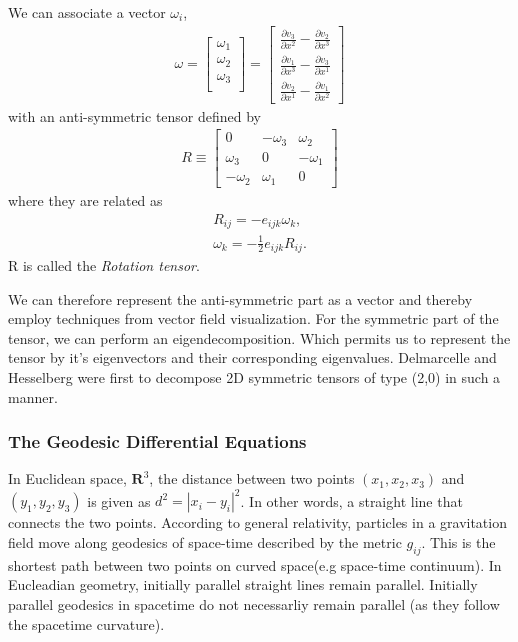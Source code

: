 \documentclass[main.tex]{subfiles}
\begin{document}
We can associate a vector $\omega_i$, 
\begin{align*}
\omega = 
\begin{bmatrix}
\omega_1\\
\omega_2\\
\omega_3\\
\end{bmatrix} =
\begin{bmatrix}
\frac{\partial v_3}{\partial x^2} - \frac{\partial v_2}{\partial x^3}\\
\frac{\partial v_1}{\partial x^3} - \frac{\partial v_3}{\partial x^1}\\
\frac{\partial v_2}{\partial x^1} - \frac{\partial v_1}{\partial x^2}
\end{bmatrix}
\end{align*}
with an anti-symmetric tensor defined by
\begin{align*}
R \equiv
\begin{bmatrix}
0  & -\omega_3 & \omega_2\\
\omega_3 & 0 & -\omega_1\\
-\omega_2 & \omega_1 & 0
\end{bmatrix}
\end{align*}
where they are related as
\begin{align*}
R_{ij} = -e_{ijk}\omega_k,\\
\omega_k = -\frac{1}{2}e_{ijk}R_{ij}.
\end{align*}
R is called the \emph{Rotation tensor}.

We can therefore represent the anti-symmetric part as a vector and thereby employ techniques
from vector field visualization. For the symmetric part of the tensor, we can perform an 
eigendecomposition. Which permits us to represent the tensor by it's eigenvectors and their 
corresponding eigenvalues. Delmarcelle and Hesselberg \cite{DH92} were first to decompose 2D 
symmetric tensors of type (2,0) in such a manner.

\subsubsection{The Geodesic Differential Equations}
In Euclidean space, $\mathbf{R}^3$, the distance between two points $(x_1,x_2,x_3)$ and
$(y_1,y_2,y_3)$ is given as $d^2 = |x_i - y_i|^2$. In other words, a straight line that
connects the two points. According to general relativity, particles in a gravitation field
move along geodesics of space-time described by the metric $g_{ij}$. This is 
the shortest path between two points on curved space(e.g space-time continuum). 
In Eucleadian geometry, initially parallel straight lines remain parallel. 
Initially parallel geodesics in spacetime do not necessarliy remain parallel
(as they follow the spacetime curvature).
\end{document}

